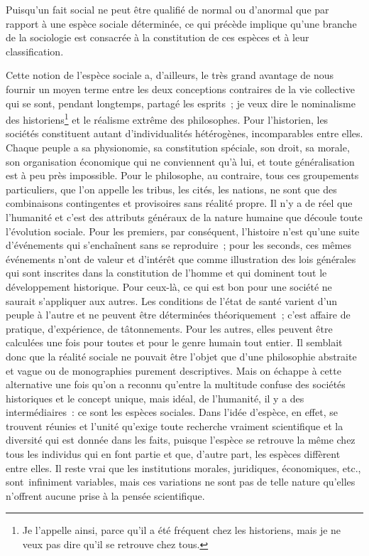 \documentclass[french,twoside]{book} %
\newcommand\chaptercont{} %
\begin{document}
\chaptercont
\noindent Puisqu’un fait social ne peut être qualifié de normal ou d’anormal que par rapport à une espèce sociale déterminée, ce qui précède implique qu’une branche de la sociologie est consacrée à la constitution de ces espèces et à leur classification.\par
Cette notion de l’espèce sociale a, d’ailleurs, le très grand avantage de nous fournir un moyen terme entre les deux conceptions contraires de la vie collective qui se sont, pendant longtemps, partagé les esprits ; je veux dire le nominalisme des historiens\footnote{ Je l’appelle ainsi, parce qu’il a été fréquent chez les historiens, mais je ne veux pas dire qu’il se retrouve chez tous.} et le réalisme extrême des philosophes. Pour l’historien, les sociétés constituent autant d’individualités hétérogènes, incomparables entre elles. Chaque peuple a sa physionomie, sa constitution spéciale, son droit, sa morale, son organisation économique qui ne conviennent qu’à lui, et toute généralisation est à peu près impossible. Pour le philosophe, au contraire, tous ces groupements particuliers, que l’on appelle les tribus, les cités, les nations, ne sont que des combinaisons contingentes et provisoires sans réalité propre. Il n’y a de réel que l’humanité et c’est des attributs généraux de la nature humaine que découle toute l’évolution sociale. Pour les premiers, par conséquent, l’histoire n’est qu’une suite d’événements qui s’enchaînent sans se reproduire ; pour les seconds, ces mêmes événements n’ont de valeur et d’intérêt que comme illustration des lois générales qui sont inscrites dans la constitution de l’homme et qui dominent tout le développement historique. Pour ceux-là, ce qui est bon pour une société ne saurait s’appliquer aux autres. Les conditions de l’état de santé varient d’un peuple à l’autre et ne peuvent être déterminées théoriquement ; c’est affaire de pratique, d’expérience, de tâtonnements. Pour les autres, elles peuvent être calculées une fois pour toutes et pour le genre humain tout entier. Il semblait donc que la réalité sociale ne pouvait être l’objet que d’une philosophie abstraite et vague ou de monographies purement descriptives. Mais on échappe à cette alternative une fois qu’on a reconnu qu’entre la multitude confuse des sociétés historiques et le concept unique, mais idéal, de l’humanité, il y a des intermédiaires : ce sont les espèces sociales. Dans l’idée d’espèce, en effet, se trouvent réunies et l’unité qu’exige toute recherche vraiment scientifique et la diversité qui est donnée dans les faits, puisque l’espèce se retrouve la même chez tous les individus qui en font partie et que, d’autre part, les espèces diffèrent entre elles. Il reste vrai que les institutions morales, juridiques, économiques, etc., sont infiniment variables, mais ces variations ne sont pas de telle nature qu’elles n’offrent aucune prise à la pensée scientifique.\par
\end{document}
